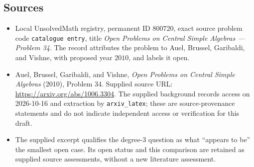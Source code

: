\documentclass[11pt]{article}
\begin{document}
\subsection{Sources}
\begin{itemize}
\item Local UnsolvedMath registry, permanent ID \(800720\), exact source problem code \texttt{catalogue entry}, title \emph{Open Problems on Central Simple Algebras --- Problem 34}. The record attributes the problem to Auel, Brussel, Garibaldi, and Vishne, with proposed year \(2010\), and labels it open.
\item Auel, Brussel, Garibaldi, and Vishne, \emph{Open Problems on Central Simple Algebras} (2010), Problem 34. Supplied source URL: \url{https://arxiv.org/abs/1006.3304}. The supplied background records access on 2026-10-16 and extraction by \texttt{arxiv\_latex}; these are source-provenance statements and do not indicate independent access or verification for this draft.
\item The supplied excerpt qualifies the degree-\(3\) question as what ``appears to be'' the smallest open case. Its open status and this comparison are retained as supplied source assessments, without a new literature assessment.
\end{itemize}
\end{document}
